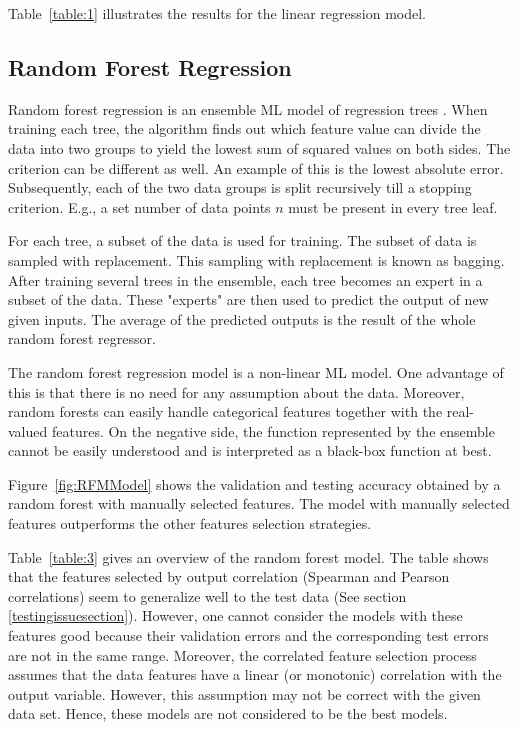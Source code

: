 \documentclass[11pt]{article}
\begin{document}
Table~\ref{table:1} illustrates the results for the linear regression model.

\subsection{Random Forest Regression}
\label{RandomForestRegressionLabel}
Random forest regression is an ensemble ML model of regression trees \cite{randomforestpaper}.
When training each tree,  the algorithm finds out which feature value can divide the data into two groups to yield the lowest sum of squared values on both sides. The criterion can be different as well. An example of this is the lowest absolute error.
Subsequently, each of the two data groups is split recursively till a stopping criterion. E.g., a set number of data points $n$ must be present in every tree leaf.

For each tree,  a subset of the data is used for training. 
The subset of data is sampled with replacement. This sampling with replacement is known as bagging.
After training several trees in the ensemble, each tree becomes an expert in a subset of the data. These "experts" are then used to predict the output of new given inputs.
The average of the predicted outputs is the result of the whole random forest regressor.

The random forest regression model is a non-linear ML model.
One advantage of this is that there is no need for any assumption about the data.
Moreover, random forests can easily handle categorical features together with the real-valued features.
On the negative side,  the function represented by the ensemble cannot be easily understood and is interpreted as a black-box function at best.

Figure~\ref{fig:RFMModel} shows the validation and testing accuracy obtained by a random forest with manually selected features.
The model with manually selected features outperforms the other features selection strategies.

Table~\ref{table:3} gives an overview of the random forest model.
The table shows that the features selected by output correlation (Spearman and Pearson correlations) seem to generalize well to the test data (See section \ref{testingissuesection}).
However,  one cannot consider the models with these features good because their validation errors and the corresponding test errors are not in the same range.
Moreover,  the correlated feature selection process assumes that the data features have a linear (or monotonic) correlation with the output variable. However, this assumption may not be correct with the given data set. Hence, these models are not considered to be the best models.
\end{document}
